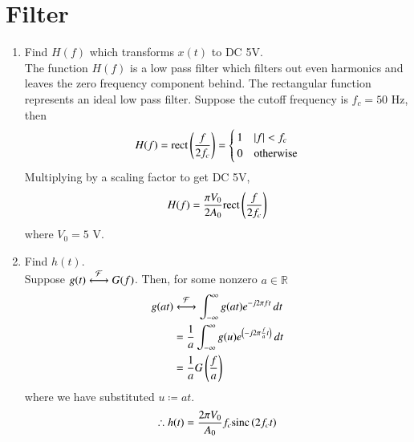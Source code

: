 \documentclass[journal,12pt,twocolumn]{IEEEtran}
\renewcommand\thesection{\arabic{section}}
\begin{document}
\section{Filter}
\begin{enumerate}[label=\thesection.\arabic*, ref=\thesection.\theenumi]


\item Find $H(f)$ which transforms $x(t)$ to DC 5V. \\
\solution The function $H(f)$ is a low pass filter which filters out
even harmonics and leaves the zero frequency component behind.
The rectangular function represents an ideal low pass filter.
Suppose the cutoff frequency is $f_c = 50$ Hz, then
\begin{align}
    H(f) = \text{rect}\left(\frac{f}{2f_c}\right) =
    \begin{cases}
        1 & \left\vert f\right\vert < f_c \\
        0 & \textrm{otherwise}
    \end{cases}
    \label{eq:Hf}
\end{align}
Multiplying by a scaling factor to get DC 5V,
\begin{align*}
    H(f) = \frac{\pi V_0}{2A_0}\text{rect}\left(\frac{f}{2f_c}\right)
\end{align*}
where $V_0 = 5$ V\@.

\item Find $h(t)$. \\
\solution Suppose $g(t)\overset{\mathcal{F}}{ \longleftrightarrow}G(f)$.
Then, for some nonzero $a \in \mathbb{R}$
\begin{align*}
	g(at)&\overset{\mathcal{F}}{ \longleftrightarrow}\int_{-\infty}^{\infty}g(at)e^{-j2\pi ft}\, dt \\
	&=\frac{1}{a}\int_{-\infty}^{\infty}g(u)e^{\left(-j2\pi \frac{f}{a}t\right)}\, dt \\
	&=\frac{1}{a}G\left(\frac{f}{a}\right)
	\label{eq:t-scaling}
\end{align*}
where we have substituted $u \coloneqq at$.
\begin{align*}
    \therefore h(t) = \frac{2\pi V_0}{A_0}f_c\text{sinc}\left(2f_c t\right)
\end{align*}



\end{enumerate}
\end{document}
